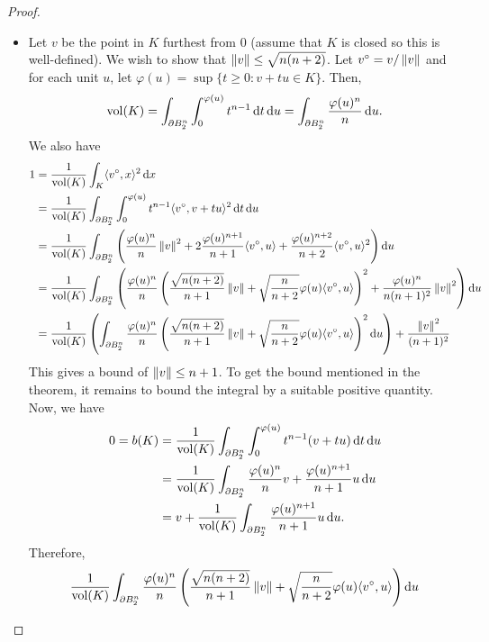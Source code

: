 \begin{proof}
\begin{itemize}
				\item Let $v$ be the point in $K$ furthest from $0$ (assume that $K$ is closed so this is well-defined). We wish to show that $\left\lVert v\right\rVert\leq\sqrt{n(n+2)}$. Let $v^{\circ} = v/\left\lVert v\right\rVert$ and for each unit $u$, let $\varphi(u) = \sup\{t\geq 0 : v+tu\in K\}$. Then,
				\[ \operatorname{vol}(K) = \int_{\partial B_2^n} \int_{0}^{\varphi(u)} t^{n-1}\operatorname{d}\!{t}\operatorname{d}\!{u} = \int_{\partial B_2^n} \frac{\varphi(u)^n}{n} \operatorname{d}\!{u}. \]
				We also have
				\begin{align*}
					1 &= \frac{1}{\operatorname{vol}(K)} \int_K \langle v^\circ, x\rangle^2 \operatorname{d}\!{x} \\
					 &=  \frac{1}{\operatorname{vol}(K)} \int_{\partial B_2^n} \int_0^{\varphi(u)} t^{n-1} \langle v^\circ, v+tu\rangle^2 \operatorname{d}\!{t}\operatorname{d}\!{u} \\
					 &= \frac{1}{\operatorname{vol}(K)} \int_{\partial B_2^n} \left( \frac{\varphi(u)^n}{n}\left\lVert v\right\rVert^2 + 2\frac{\varphi(u)^{n+1}}{n+1} \langle v^\circ, u\rangle + \frac{\varphi(u)^{n+2}}{n+2} \langle v^\circ, u\rangle^2 \right) \operatorname{d}\!{u} \\
					 &= \frac{1}{\operatorname{vol}(K)} \int_{\partial B_2^n} \left( \frac{\varphi(u)^n}{n} \left(\frac{\sqrt{n(n+2)}}{n+1}\left\lVert v\right\rVert + \sqrt{\frac{n}{n+2}}\varphi(u) \langle v^\circ, u\rangle\right)^2 + \frac{\varphi(u)^n}{n(n+1)^2}\left\lVert v\right\rVert^2 \right) \operatorname{d}\!{u} \\
					 &= \frac{1}{\operatorname{vol}(K)} \left( \int_{\partial B_2^n} \frac{\varphi(u)^n}{n} \left(\frac{\sqrt{n(n+2)}}{n+1}\left\lVert v\right\rVert + \sqrt{\frac{n}{n+2}}\varphi(u)\langle v^\circ, u\rangle\right)^2 \operatorname{d}\!{u} \right) + \frac{\left\lVert v\right\rVert^2}{(n+1)^2}
				\end{align*}
				This gives a bound of $\left\lVert v\right\rVert\leq n+1$. To get the bound mentioned in the theorem, it remains to bound the integral by a suitable positive quantity. Now, we have
				\begin{align*}
					0 = b(K) &= \frac{1}{\operatorname{vol}(K)} \int_{\partial B_2^n} \int_{0}^{\varphi(u)} t^{n-1} (v+tu) \operatorname{d}\!{t}\operatorname{d}\!{u} \\
					 &= \frac{1}{\operatorname{vol}(K)} \int_{\partial B_2^n} \frac{\varphi(u)^n}{n}v + \frac{\varphi(u)^{n+1}}{n+1}u \operatorname{d}\!{u} \\
					 &= v + \frac{1}{\operatorname{vol}(K)} \int_{\partial B_2^n} \frac{\varphi(u)^{n+1}}{n+1}u\operatorname{d}\!{u}.
				\end{align*}
				Therefore,
				\begin{multline*}
					\frac{1}{\vol(K)} \int_{\partial B_2^n} \frac{\varphi(u)^n}{n} \left(\frac{\sqrt{n(n+2)}}{n+1}\norm{v} + \sqrt{\frac{n}{n+2}}\varphi(u) \langle v^\circ,u\rangle\right) \d{u} \\

\end{multline*}
\end{itemize}
\end{proof}
